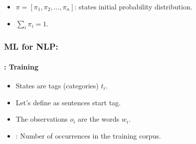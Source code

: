 \documentclass[xcolor=table]{beamer}
\begin{document}
\begin{frame}
\begin{minipage}{.45\textwidth}
		\end{minipage}
		
		\begin{itemize}
			\item $\pi = [\pi_1, \pi_2, \ldots, \pi_n ]$: states initial probability distribution.
			\item $\sum_i \pi_i = 1$.
		\end{itemize}
		
	\end{frame}
	
	\begin{frame}
		\frametitle{ML for NLP: \insertsection}
		\framesubtitle{\insertsubsection: Training}
		
		\begin{itemize}
			\item States are tags (categories) $t_i$.
			\item Let's define  as sentences start tag.
			\item The observations $o_i$ are the words $w_i$.
			\item {}: Number of occurrences in the training corpus.
		\end{itemize}
		
		\begin{block}{HMM training}
			\vskip-1.5em\[
			\text{Transition probabilities: } P(t_i | t_{i-1}) = \frac{C(t_{i-1}, t_i)}{C(t_{i-1})} 
			\]\vskip-2em\[
			\text{Emission probabilities: } P(w_i | t_i) = \frac{C(t_i, w_i)}{C(t_i)}
			\]\vskip-2em\[
			\text{Initial distribution: } \pi_i = P(t_i | DEBUT) = \frac{C(DEBUT, t_i)}{C(DEBUT)}
			\]
		\end{block}
	\end{frame}
	
\end{document}
